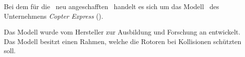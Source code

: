 
Bei dem für die \DHBW\ neu angeschafften \Quad\ handelt es sich um das Modell \Clover\ des Unternehmens \textit{Copter Express} (\COEX).

Das Modell \Clover wurde vom Hersteller zur Ausbildung und Forschung an \Quad[n] entwickelt. Das Modell besitzt einen Rahmen, welche die Rotoren bei Kollisionen schützten soll.


